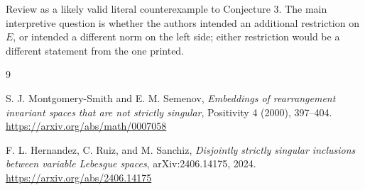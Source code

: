 \documentclass[11pt]{article}
\begin{document}
Review as a likely valid literal counterexample to Conjecture 3. The main
interpretive question is whether the authors intended an additional restriction
on \(E\), or intended a different norm on the left side; either restriction
would be a different statement from the one printed.

\begin{thebibliography}{9}

S. J. Montgomery-Smith and E. M. Semenov,
\emph{Embeddings of rearrangement invariant spaces that are not strictly
singular}, Positivity 4 (2000), 397--404.
\url{https://arxiv.org/abs/math/0007058}

F. L. Hernandez, C. Ruiz, and M. Sanchiz,
\emph{Disjointly strictly singular inclusions between variable Lebesgue
spaces}, arXiv:2406.14175, 2024.
\url{https://arxiv.org/abs/2406.14175}

\end{thebibliography}
\end{document}
